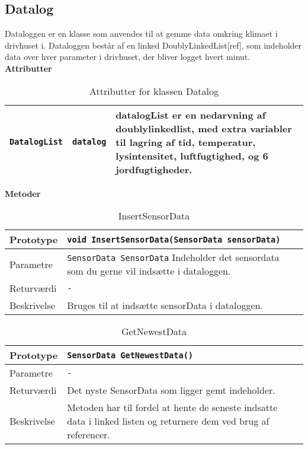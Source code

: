 \subsection{Datalog}

Dataloggen er en klasse som anvendes til at gemme data omkring klimaet i drivhuset i. Dataloggen består af en linked DoublyLinkedList[ref], som indeholder data over hver parameter i drivhuset, der bliver logget hvert minut.\\


\textbf{Attributter}

\begin{table}[h]
\begin{tabularx}{\textwidth}{| >{\raggedright\arraybackslash}X | >{\raggedright\arraybackslash}X | >{\raggedright\arraybackslash}p{10 cm} |} \hline
\texttt{DatalogList} & \texttt{datalog} & datalogList er en nedarvning af doublylinkedlist, med extra variabler til lagring af tid, temperatur, lysintensitet, luftfugtighed, og 6 jordfugtigheder. \\\hline
\end{tabularx}
\caption{Attributter for klassen Datalog}
\label{table:Datalog_attributter}
\end{table}

\textbf{Metoder}

\begin{table}[h]
\begin{tabularx}{\textwidth}{| >{\raggedright\arraybackslash}p{2.5 cm} | >{\raggedright\arraybackslash}X |} \hline
Prototype & \texttt{void InsertSensorData(SensorData sensorData)} \\\hline
Parametre & \texttt{SensorData SensorData} \newline 
Indeholder det sensordata som du gerne vil indsætte i dataloggen. \\\hline
Returværdi & \texttt{-} \\\hline
Beskrivelse & Bruges til at indsætte sensorData i dataloggen. \\\hline
\end{tabularx}
\caption{InsertSensorData}
\label{table:InsertSensorData}
\end{table}


\begin{table}[h]
\begin{tabularx}{\textwidth}{| >{\raggedright\arraybackslash}p{2.5 cm} | >{\raggedright\arraybackslash}X |} \hline
Prototype & \texttt{SensorData GetNewestData()} \\\hline
Parametre & \texttt{-}\\\hline
Returværdi & Det nyste SensorData som  ligger gemt indeholder. \\\hline
Beskrivelse & Metoden har til fordel at hente de seneste indsatte data i linked listen og returnere dem ved brug af referencer. \\\hline
\end{tabularx}
\caption{GetNewestData}
\label{table:GetNewestData}
\end{table}



